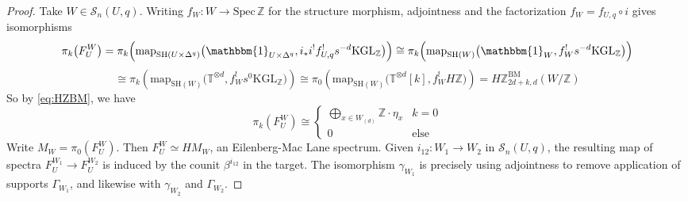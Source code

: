 \documentclass[11pt, twoside]{article}
\numberwithin{equation}{section}
\theoremstyle{definition}
\newcommand{\bb}[1]{\mathbb{#1}}
\newcommand{\spec}{\mathrm{Spec} \,}
\newcommand{\map}{\mathrm{map}}
\newcommand{\Kgl}{\mathrm{KGL}}
\newcommand{\sh}{\mathrm{SH}}
\newcommand{\bm}{\mathrm{BM}}
\begin{document}
\begin{proof}
Take \(W \in \mathcal{S}_n(U, q)\). Writing \(f_W \colon W \to \spec \bb{Z}\) for the structure morphism, adjointness and the factorization \(f_W = f_{U, q} \circ i\) gives isomorphisms 
\[\pi_k \! \left(F_U^W\right) = \pi_k \! \left(\map_{\sh(U \times \Delta^q)}\big(\mathbbm{1}_{U \times \Delta^q}, i_* i^! f_{U, q}^! s^{- d} \Kgl_\bb{Z}\big)\right) \cong \pi_k \! \left(\map_{\sh(W)}\big(\mathbbm{1}_W, f_W^! s^{- d}\Kgl_\bb{Z}\big)\right)\]
\[\cong \pi_k \! \left(\map_{\sh(W)}\big(\bb{T}^{\otimes d}, f_W^! s^0 \Kgl_\bb{Z}\big)\right) \cong \pi_0 \! \left(\map_{\sh(W)}\big(\bb{T}^{\otimes d}[k], f_W^!H\bb{Z}\big)\right) = H\bb{Z}_{2d + k, d}^\bm(W/\bb{Z})\]
So by \eqref{eq:HZBM}, we have 
\[\pi_k \! \left(F_U^W\right) \cong \begin{cases} \displaystyle \bigoplus_{x \in W_{(d)}} \bb{Z} \cdot \eta_x & k = 0\\
0 & \text{else}
\end{cases}\]
Write \(M_W = \pi_0(F_U^W)\). Then \(F_U^W \simeq HM_W\), an Eilenberg-Mac Lane spectrum. Given \(i_{12} \colon W_1 \to W_2\) in \(\mathcal{S}_n(U, q)\), the resulting map of spectra \(F_U^{W_1} \to F_U^{W_2}\) is induced by the counit \(\beta^{i_{12}} \) in the target. The isomorphism \(\gamma_{W_1}\) is precisely using adjointness to remove application of supports \(\Gamma_{W_1}\), and likewise with \(\gamma_{W_2}\) and \(\Gamma_{W_2}\).


\end{proof}
\end{document}
